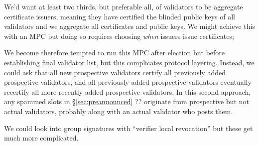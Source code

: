 We'd want at least two thirds, but preferable all, of validators to be aggregate certificate issuers, meaning they have certified the blinded public keys of all validators and we aggregate all certificates and public keys.  We might achieve this with an MPC but doing so requires choosing {\em when} issuers issue certificates;   

We become therefore tempted to run this MPC after election but before establishing final validator list, but this complicates protocol layering.  Instead, we could ask that all new prospective validators certify all previously added prospective validators, and all previously added prospective validators eventually recertify all more recently added prospective validators.  In this second approach, any spammed slots in \S\ref{sec:preannounced} ?? originate from prospective but not actual validators, probably along with an actual validator who posts them.  

We could look into group signatures with ``verifier local revocation'' but these get much more complicated.




